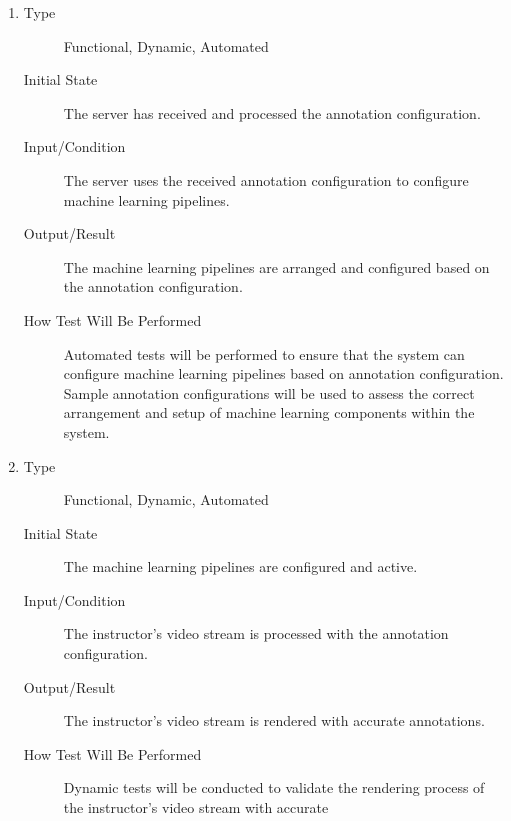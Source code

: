 \documentclass[12pt, titlepage]{article}
\begin{document}
\begin{enumerate}[FR-T1]
\item \label{FRT8}
  \begin{description}
  \item[Type] Functional, Dynamic, Automated
  \item[Initial State] The server has received and processed the annotation
    configuration.
  \item[Input/Condition] The server uses the received annotation configuration to
    configure machine learning pipelines.
  \item[Output/Result] The machine learning pipelines are arranged and configured
    based on the annotation configuration.
  \item[How Test Will Be Performed] Automated tests will be performed to ensure
    that the system can configure machine learning pipelines based on annotation
    configuration. Sample annotation configurations will be used to assess the
    correct arrangement and setup of machine learning components within the
    system.
  \end{description}
\item \label{FRT9}
  \begin{description}
  \item[Type] Functional, Dynamic, Automated
  \item[Initial State] The machine learning pipelines are configured and active.
  \item[Input/Condition] The instructor's video stream is processed with the
    annotation configuration.
  \item[Output/Result] The instructor's video stream is rendered with accurate
    annotations.
  \item[How Test Will Be Performed] Dynamic tests will be conducted to validate the
    rendering process of the instructor's video stream with accurate

\end{description}
\end{enumerate}
\end{document}
